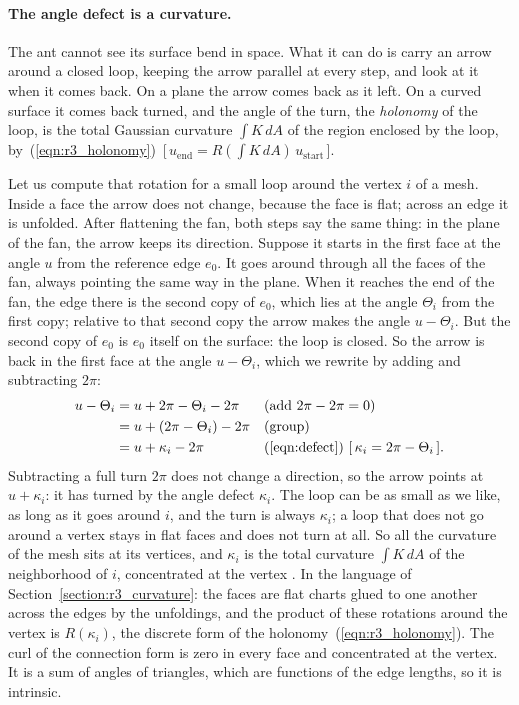 \paragraph{The angle defect is a curvature.} The ant cannot see its surface bend in space. What it can do is carry an arrow around a closed loop, keeping the arrow parallel at every step, and look at it when it comes back. On a plane the arrow comes back as it left. On a curved surface it comes back turned, and the angle of the turn, the \emph{holonomy} of the loop, is the total Gaussian curvature $\int K\, dA$ of the region enclosed by the loop, by~(\ref{eqn:r3_holonomy})~[\,$u_{\text{end}} = R(\int K\,dA)\,u_{\text{start}}$\,].

Let us compute that rotation for a small loop around the vertex $i$ of a mesh. Inside a face the arrow does not change, because the face is flat; across an edge it is unfolded. After flattening the fan, both steps say the same thing: in the plane of the fan, the arrow keeps its direction. Suppose it starts in the first face at the angle $u$ from the reference edge $e_0$. It goes around through all the faces of the fan, always pointing the same way in the plane. When it reaches the end of the fan, the edge there is the second copy of $e_0$, which lies at the angle $\Theta_i$ from the first copy; relative to that second copy the arrow makes the angle $u - \Theta_i$. But the second copy of $e_0$ is $e_0$ itself on the surface: the loop is closed. So the arrow is back in the first face at the angle $u - \Theta_i$, which we rewrite by adding and subtracting $2\pi$:
\begin{align*}
u - \Theta_i &= u + 2\pi - \Theta_i - 2\pi && \text{(add $2\pi - 2\pi = 0$)} \\
&= u + (2\pi - \Theta_i) - 2\pi && \text{(group)} \\
&= u + \kappa_i - 2\pi && \text{(\ref{eqn:defect})~[\,$\kappa_i = 2\pi - \Theta_i$\,].}
\end{align*}
Subtracting a full turn $2\pi$ does not change a direction, so the arrow points at $u + \kappa_i$: it has turned by the angle defect $\kappa_i$. The loop can be as small as we like, as long as it goes around $i$, and the turn is always $\kappa_i$; a loop that does not go around a vertex stays in flat faces and does not turn at all. So all the curvature of the mesh sits at its vertices, and $\kappa_i$ is the total curvature $\int K\, dA$ of the neighborhood of $i$, concentrated at the vertex \cite{Sharp2019}. In the language of Section~\ref{section:r3_curvature}: the faces are flat charts glued to one another across the edges by the unfoldings, and the product of these rotations around the vertex is $R(\kappa_i)$, the discrete form of the holonomy~(\ref{eqn:r3_holonomy}). The curl of the connection form is zero in every face and concentrated at the vertex. It is a sum of angles of triangles, which are functions of the edge lengths, so it is intrinsic.

